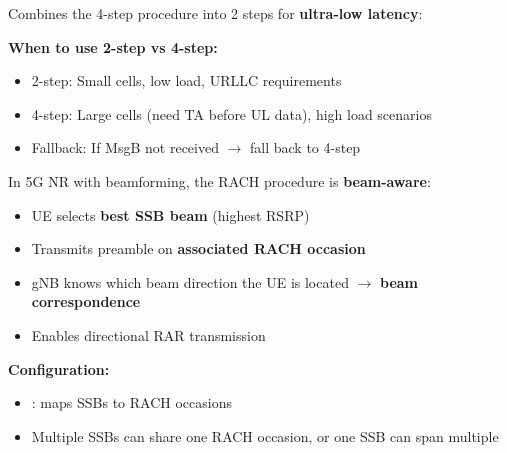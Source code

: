 


\CNchained{}

\CNchained{}

Combines the 4-step procedure into 2 steps for \textbf{ultra-low latency}:


\textbf{When to use 2-step vs 4-step:}

\begin{itemize}
\tightlist
\item
  2-step: Small cells, low load, URLLC requirements
\item
  4-step: Large cells (need TA before UL data), high load scenarios
\item
  Fallback: If MsgB not received \ensuremath{\to} fall back to 4-step
\end{itemize}



In 5G NR with beamforming, the RACH procedure is \textbf{beam-aware}:


\begin{itemize}
\tightlist
\item
  UE selects \textbf{best SSB beam} (highest RSRP)
\item
  Transmits preamble on \textbf{associated RACH occasion}
\item
  gNB knows which beam direction the UE is located \ensuremath{\to} \textbf{beam correspondence}
\item
  Enables directional RAR transmission
\end{itemize}

\textbf{Configuration:}

\begin{itemize}
\tightlist
\item
  : maps SSBs to RACH occasions
\item
  Multiple SSBs can share one RACH occasion, or one SSB can span multiple
\end{itemize}

